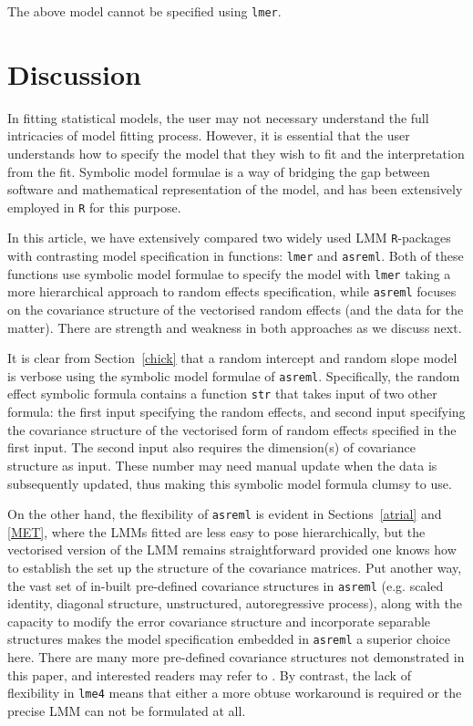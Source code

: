 \documentclass[runningheads]{llncs}\usepackage[]{graphicx}\usepackage[]{color}
\begin{document}
The above model cannot be specified using \texttt{lmer}.

\hypertarget{discussion}{%
	\section{Discussion}\label{discussion}}

In fitting statistical models, the user may not necessary understand the full intricacies of model fitting process. However, it is essential that the user understands how to specify the model that they wish to fit and the interpretation from the fit. Symbolic model formulae is a way of bridging the gap between software and mathematical representation of the model, and has been extensively employed in \texttt{R} for this purpose.

In this article, we have extensively compared two widely used LMM \texttt{R}-packages with contrasting model specification in functions: \texttt{lmer} and \texttt{asreml}. Both of these functions use symbolic model formulae to specify the model with \texttt{lmer} taking a more hierarchical approach to random effects specification, while \texttt{asreml} focuses on the covariance structure of the vectorised random effects (and the data for the matter). There are strength and weakness in both approaches as we discuss next.

It is clear from Section~\ref{chick} that a random intercept and random slope model is verbose using the symbolic model formulae of \texttt{asreml}. Specifically, the random effect symbolic formula contains a function \texttt{str} that takes input of two other formula: the first input specifying the random effects, and second input specifying the covariance structure of the vectorised form of random effects specified in the first input. The second input also requires the dimension(s) of covariance structure as input. These number may need manual update when the data is subsequently updated, thus making this symbolic model formula clumsy to use.

On the other hand, the flexibility of \texttt{asreml} is evident in Sections~\ref{atrial} and \ref{MET}, where the LMMs fitted are less easy to pose hierarchically, but the vectorised version of the LMM remains straightforward provided one knows how to establish the set up the structure of the covariance matrices. Put another way, the vast set of in-built pre-defined covariance structures in \texttt{asreml} (e.g. scaled identity, diagonal structure, unstructured, autoregressive process), along with the capacity to modify the error covariance structure and incorporate separable structures makes the model specification embedded in \texttt{asreml} a superior choice here. There are many more pre-defined covariance structures not demonstrated in this paper, and interested readers may refer to \citet{Butler2009, Butler2018}.
By contrast, the lack of flexibility in \texttt{lme4} means that either a more obtuse workaround is required or the precise LMM can not be formulated at all.
\end{document}
